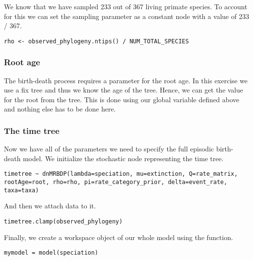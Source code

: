 We know that we have sampled 233 out of 367 living primate species.
To account for this we can set the sampling parameter as a constant node with a value of 233 / 367.
{\tt \begin{snugshade*}
\begin{lstlisting}
rho <- observed_phylogeny.ntips() / NUM_TOTAL_SPECIES
\end{lstlisting}
\end{snugshade*}}


\subsubsection{Root age}

The birth-death process requires a parameter for the root age.
In this exercise we use a fix tree and thus we know the age of the tree.
Hence, we can get the value for the root from the \citet{MagnusonFord2012} tree.
This is done using our global variable  defined above and nothing else has to be done here.

\subsubsection{The time tree}

Now we have all of the parameters we need to specify the full episodic birth-death model.
We initialize the stochastic node representing the time tree.
{\tt \begin{snugshade*}
\begin{lstlisting}
timetree ~ dnMRBDP(lambda=speciation, mu=extinction, Q=rate_matrix, rootAge=root, rho=rho, pi=rate_category_prior, delta=event_rate, taxa=taxa)
\end{lstlisting}
\end{snugshade*}}
And then we attach data to it.
{\tt \begin{snugshade*}
\begin{lstlisting}
timetree.clamp(observed_phylogeny)
\end{lstlisting}
\end{snugshade*}}



Finally, we create a workspace object of our whole model using the  function.
{\tt \begin{snugshade*}
\begin{lstlisting}
mymodel = model(speciation)
\end{lstlisting}
\end{snugshade*}}

